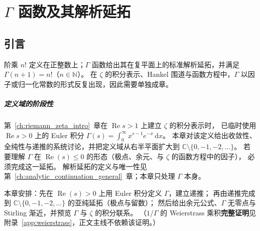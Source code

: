 

\chapter{\texorpdfstring{$\Gamma$}{Gamma} 函数及其解析延拓}\label{ch:gamma_function}

\section{引言}\label{sec:gamma_intro}

阶乘 $n!$ 定义在正整数上；$\Gamma$ 函数给出其在复平面上的标准解析延拓，并满足 $\Gamma(n+1)=n!$（$n\in\mathbb{N}$）。
在 $\zeta$ 的积分表示、Hankel 围道与函数方程中，$\Gamma$ 以因子或归一化常数的形式反复出现，因此需要单独成章。

\paragraph{定义域的阶段性}
第~\ref{ch:riemann_zeta_intro}~章在 $\operatorname{Re}s>1$ 上建立 $\zeta$ 的积分表示时，
已临时使用 $\operatorname{Re}s>0$ 上的 Euler 积分 $\Gamma(s)=\int_0^\infty x^{s-1}e^{-x}\,\mathrm{d}x$。
本章对该定义给出收敛性、全纯性与递推的系统讨论，并把定义域从右半平面扩大到
$\mathbb{C}\setminus\{0,-1,-2,\ldots\}$。
若要理解 $\Gamma$ 在 $\operatorname{Re}(s)\le 0$ 的形态（极点、余元、与 $\zeta$ 的函数方程中的因子），
必须完成这一延拓。
解析延拓的定义与唯一性见第~\ref{ch:analytic_continuation_general}~章；本章只处理 $\Gamma$ 本身。

本章安排：先在 $\operatorname{Re}(s)>0$ 上用 Euler 积分定义 $\Gamma$，建立递推；
再由递推完成到 $\mathbb{C}\setminus\{0,-1,-2,\ldots\}$ 的亚纯延拓（极点与留数）；
然后给出余元公式、$\Gamma$ 无零点与 Stirling 渐近，并预览 $\Gamma$ 与 $\zeta$ 的积分联系。
（$1/\Gamma$ 的 Weierstrass 乘积\textbf{完整证明}见附录~\ref{app:weierstrass}，正文主线不依赖该证明。）


